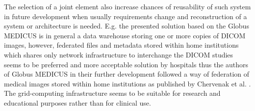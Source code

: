 The selection of a joint element also increase chances of reusability of such system in future development when usually requirements change and reconstruction of a system or architecture is needed. E.g. the presented solution based on the Globus MEDICUS is in general a data warehouse storing one or more copies of DICOM images, however, federated files and metadata stored within home institutions which shares only network infrastructure to interchange the DICOM studies seems to be preferred and more acceptable solution by hospitals thus the authors of Globus MEDICUS in their further development followed a way of federation of medical images stored within home institutions as published by Chervenak et al. \cite{Chervenak2012}. The grid-computing infrastructure seems to be suitable for research and educational purposes rather than for clinical use. %

%



 

